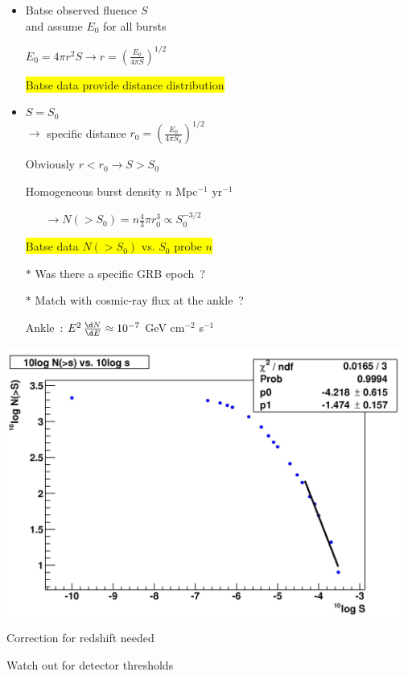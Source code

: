 \Tr
\begin{itemize}
\item Batse observed fluence $S$\\
      and assume $E_{0}$ for all bursts
\item[] $E_{0}=4\pi r^{2} S \rightarrow r=\left(\frac{E_{0}}{4\pi S}\right)^{1/2}$
\item[] \colorbox{yellow}{Batse data provide distance distribution}
\item $S=S_{0}$\\
      $\rightarrow$ specific distance $r_{0}=\left(\frac{E_{0}}{4\pi S_{0}}\right)^{1/2}$
\item[] Obviously $r < r_{0} \rightarrow S > S_{0}$
\item[] Homogeneous burst density $n$ Mpc$^{-1}$ yr$^{-1}$
\begin{itemize}
\item[] $\rightarrow N(>S_{0})=n\frac{4}{3}\pi r_{0}^{3} \propto S_{0}^{-3/2}$
\end{itemize}
\item[] \colorbox{yellow}{Batse data $N(>S_{0})$ vs. $S_{0}$ probe $n$}
\end{itemize}

\begin{itemize}
\item[$\ast$] {\blue Was there a specific GRB epoch~?}
\item[$\ast$] {\blue Match with cosmic-ray flux at the ankle~?}
\item[] Ankle~: $E^{2}\,\frac{\d N}{\d E} \approx 10^{-7}$ GeV cm$^{-2}$ s$^{-1}$
\end{itemize}

\newpage

\vspace*{1cm}

\begin{center}
\includegraphics[keepaspectratio,width=13cm]{batse-n-s}
\end{center}
%
\begin{itemize}
{\red
\item Correction for redshift needed
\item Watch out for detector thresholds
}
\end{itemize}

